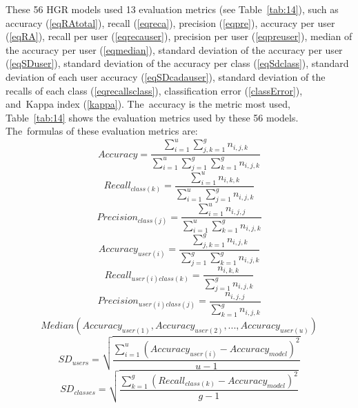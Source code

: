 \documentclass[sensors,review,accept,moreauthors,pdftex]{Definitions/mdpi}
\begin{document}
These 56 HGR models used 13 evaluation metrics (see Table~\ref{tab:14}), such as accuracy (\ref{eqRAtotal}), recall (\ref{eqreca}), precision (\ref{eqpre}), accuracy per user (\ref{eqRA}), recall per user (\ref{eqrecauser}), precision per user (\ref{eqpreuser}), median of the accuracy per user (\ref{eqmedian}), standard deviation of the accuracy per user (\ref{eqSDuser}), standard deviation of the accuracy per class (\ref{eqSdclass}), standard deviation of each user accuracy (\ref{eqSDcadauser}), standard deviation of the recalls of each class (\ref{eqrecallsclass}), classification error (\ref{classError}), and~Kappa index (\ref{kappa}). The~accuracy is the metric most used, Table~\ref{tab:14} shows the evaluation metrics used by these 56 models. The~formulas of these evaluation metrics are:
\begin{equation} \label{eqRAtotal}
Accuracy=\frac{\sum_{i=1}^{u}\sum_{j,k=1}^{g}n_{i,j,k}}{\sum_{i=1}^{u}\sum_{j=1}^{g}\sum_{k=1}^{g}n_{i,j,k}}
\end{equation}
\begin{equation} \label{eqreca}
Recall_{class(k)}=\frac{\sum_{i=1}^{u}n_{i,k,k}}{\sum_{i=1}^{u}\sum_{j=1}^{g}n_{i,j,k}}
\end{equation}
\begin{equation} \label{eqpre}
Precision_{class(j)}=\frac{\sum_{i=1}^{u}n_{i,j,j}}{\sum_{i=1}^{u}\sum_{k=1}^{g}n_{i,j,k}}
\end{equation}
\begin{equation} \label{eqRA}
Accuracy_{user(i)}=\frac{\sum_{j,k=1}^{g}n_{i,j,k}}{\sum_{j=1}^{g}\sum_{k=1}^{g}n_{i,j,k}}
\end{equation}
\begin{equation} \label{eqrecauser}
Recall_{user(i)class(k)}=\frac{n_{i,k,k}}{\sum_{j=1}^{g}n_{i,j,k}}
\end{equation}
\begin{equation} \label{eqpreuser}
Precision_{user(i)class(j)}=\frac{n_{i,j,j}}{\sum_{k=1}^{g}n_{i,j,k}}
\end{equation}
\begin{equation}\label{eqmedian}
	Median(Accuracy_{user(1)},Accuracy_{user(2)},...,Accuracy_{user(u)})
\end{equation}
\begin{equation}\label{eqSDuser}
SD_{users}=\sqrt{\frac{\sum_{i=1}^{u}(Accuracy_{user(i)}-Accuracy_{model})^{2}}{u-1}}
\end{equation}
\begin{equation}\label{eqSdclass}
SD_{classes}=\sqrt{\frac{\sum_{k=1}^{g}(Recall_{class(k)}-Accuracy_{model})^{2}}{g-1}}
\end{equation}
\end{document}
